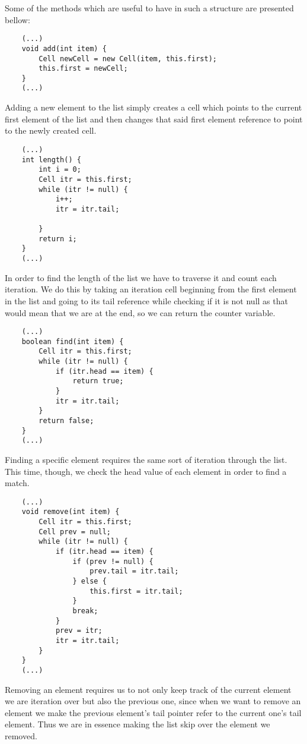 \documentclass[a4paper,11pt]{article}
\begin{document}
Some of the methods which are useful to have in such a structure are presented bellow:

\begin{verbatim}
    (...)
    void add(int item) {
        Cell newCell = new Cell(item, this.first);
        this.first = newCell;
    }
    (...)
\end{verbatim}

Adding a new element to the list simply creates a cell which points to the current first element of the list and then changes that said first element reference to point to the newly created cell.

\begin{verbatim}
    (...)
    int length() {
        int i = 0;
        Cell itr = this.first;
        while (itr != null) {
            i++;
            itr = itr.tail;

        }
        return i;
    }
    (...)
\end{verbatim}

In order to find the length of the list we have to traverse it and count each iteration. We do this by taking an iteration cell beginning from the first element in the list and going to its tail reference while checking if it is not null as that would mean that we are at the end, so we can return the counter variable.

\begin{verbatim}
    (...)
    boolean find(int item) {
        Cell itr = this.first;
        while (itr != null) {
            if (itr.head == item) {
                return true;
            }
            itr = itr.tail;
        }
        return false;
    }
    (...)
\end{verbatim}

Finding a specific element requires the same sort of iteration through the list. This time, though, we check the head value of each element in order to find a match.

\begin{verbatim}
    (...)
    void remove(int item) {
        Cell itr = this.first;
        Cell prev = null;
        while (itr != null) {
            if (itr.head == item) {
                if (prev != null) {
                    prev.tail = itr.tail;
                } else {
                    this.first = itr.tail;
                }
                break;
            }
            prev = itr;
            itr = itr.tail;
        }
    }
    (...)
\end{verbatim}
Removing an element requires us to not only keep track of the current element we are iteration over but also the previous one, since when we want to remove an element we make the previous element's tail pointer refer to the current one's tail element. Thus we are in essence making the list skip over the element we removed.
\end{document}
